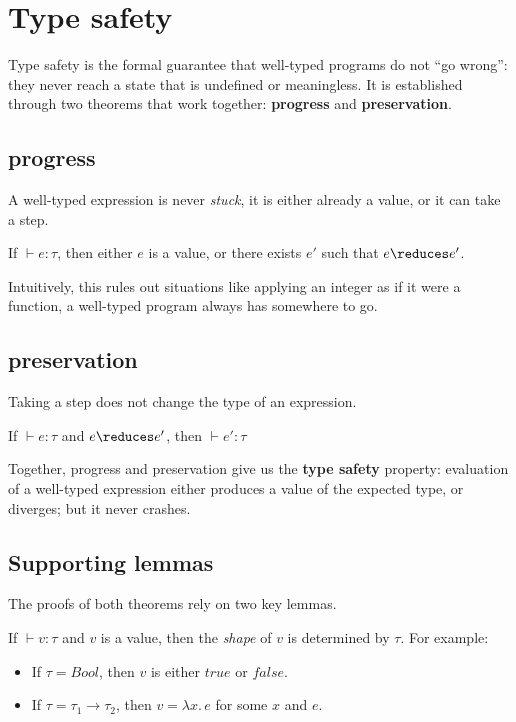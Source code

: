 \section{Type safety}
Type safety is the formal guarantee that well-typed programs do not ``go wrong'': they never reach a state that is undefined or meaningless. It is established through two theorems that work together: \textbf{progress} and \textbf{preservation}.

\subsection{progress}
A well-typed expression is never \emph{stuck}, it is either already a value, or it can take a step.
\begin{theorem}[progress]
If $\vdash e : \tau$, then either $e$ is a value, or there exists $e'$ such
that $e \reduces e'$.
\end{theorem}

Intuitively, this rules out situations like applying an integer as if it were a function, a well-typed program always has somewhere to go.

\subsection{preservation}
Taking a step does not change the type of an expression.

\begin{theorem}[preservation]
If $\vdash e : \tau$ and $e \reduces e'$, then $\vdash e' : \tau$
\end{theorem}

Together, progress and preservation give us the \textbf{type safety} property: evaluation of a well-typed expression either produces a value of the expected type, or diverges; but it never crashes.

\subsection{Supporting lemmas}
The proofs of both theorems rely on two key lemmas.
\begin{lemma}[Canonicity]
If $\vdash v : \tau$ and $v$ is a value, then the \emph{shape} of $v$
is determined by $\tau$. For example:
\begin{itemize}
    \item If $\tau = \mathit{Bool}$, then $v$ is either $\mathit{true}$
    or $\mathit{false}$.
    \item If $\tau = \tau_1 \to \tau_2$, then $v = \lambda x.\, e$ for
    some $x$ and $e$.
\end{itemize}
\end{lemma}

